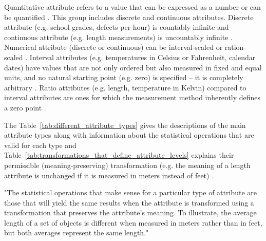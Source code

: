 				Quantitative attribute refers to a value that can be expressed as a number or can be quantified \cite{Batini2006}. This group includes discrete and continuous attributes. Discrete attribute (e.g. school grades, defects per hour) is countably infinite and continuous attribute (e.g. length measurements) is uncountably infinite \cite{Orlando2015}\cite{Batini2006}. Numerical attribute (discrete or continuous) can be interval-scaled or ration-scaled \cite{Orlando2015}. Interval attributes (e.g. temperatures in Celsius or Fahrenheit, calendar dates) have values that are not only ordered but also measured in fixed and equal units, and no natural starting point (e.g. zero) is specified – it is completely arbitrary \cite{Batini2006}. Ratio attributes (e.g. length, temperature in Kelvin) compared to interval attributes are ones for which the measurement method inherently defines a zero point \cite{Batini2006}.					
								
				The Table~\ref{tab:different_attribute_types} gives the descriptions of the main attribute types along with information about the statistical operations that are valid for each type and Table~\ref{tab:transformations_that_define_attribute_levels} explains their permissible (meaning-preserving) transformation (e.g. the meaning of a length attribute is unchanged if it is measured in meters instead of feet) \cite{Tan2013}.
				
				"The statistical operations that make sense for a particular type of attribute are those that will yield the same results when the attribute is transformed using a transformation that preserves the attribute's meaning. To illustrate, the average length of a set of objects is different when measured in meters rather than in feet, but both averages represent the same length." \cite{Tan2013}			
				
